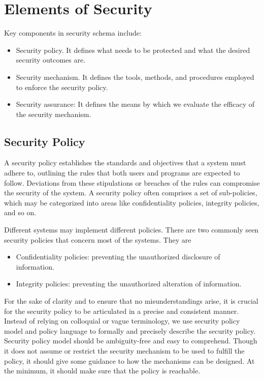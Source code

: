 \section{Elements of Security}

Key components in security schema include:
\begin{itemize}
	\item Security policy. It defines what needs to be protected and what the desired security outcomes are.
	\item Security mechanism. It defines the tools, methods, and procedures employed to enforce the security policy.
	\item Security assurance: It defines the means by which we evaluate the efficacy of the security mechanism.
\end{itemize}

\subsection{Security Policy}

A security policy establishes the standards and objectives that a system must adhere to, outlining the rules that both users and programs are expected to follow. Deviations from these stipulations or breaches of the rules can compromise the security of the system. A security policy often comprises a set of sub-policies, which may be categorized into areas like confidentiality policies, integrity policies, and so on.

Different systems may implement different policies. There are two commonly seen security policies that concern most of the systems. They are
\begin{itemize}
  \item Confidentiality policies: preventing the unauthorized disclosure of information.
  \item Integrity policies: preventing the unauthorized alteration of information.
\end{itemize}

For the sake of clarity and to ensure that no misunderstandings arise, it is crucial for the security policy to be articulated in a precise and consistent manner. Instead of relying on colloquial or vague terminology, we use security policy model and policy language to formally and precisely describe the security policy. Security policy model should be ambiguity-free and easy to comprehend. Though it does not assume or restrict the security mechanism to be used to fulfill the policy, it should give some guidance to how the mechanisms can be designed. At the minimum, it should make sure that the policy is reachable.

